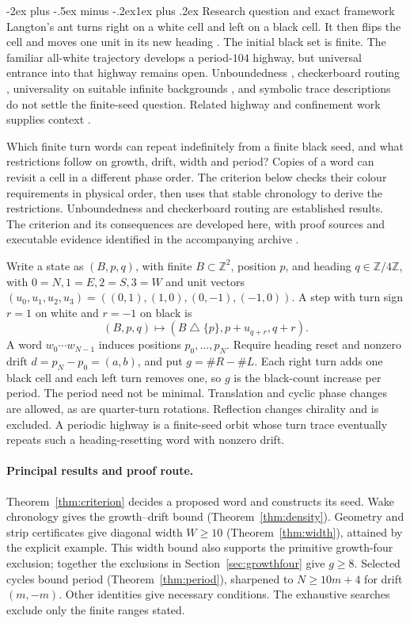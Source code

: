 \documentclass[11pt,letterpaper]{article}
\makeatletter
\renewcommand\section{\@startsection{section}{1}{\z@}%
  {-2ex plus -.5ex minus -.2ex}{1ex plus .2ex}%
  {\normalfont\Large\bfseries}}
\newcommand{\Z}{\mathbb Z}
\makeatother
\begin{document}
\section{Research question and exact framework}
Langton's ant turns right on a white cell and left on a black cell.
It then flips the cell and moves one unit in its new heading \cite{Langton1986}.
The initial black set is finite. The familiar all-white trajectory develops
a period-$104$ highway, but universal entrance into that highway remains
open. Unboundedness \cite{BunimovichTroubetzkoy1992}, checkerboard routing
\cite{GaleProppSutnerTroubetzkoy1995}, universality on suitable infinite
backgrounds \cite{GajardoMoreiraGoles2002}, and symbolic trace descriptions
\cite{Gajardo2003symbolic} do not settle the finite-seed question.
Related highway and confinement work supplies context
\cite{GajardoLutfallaRao2024,Lutfalla2025sideways,Etse2026confined}.

Which finite turn words can repeat indefinitely from a finite black seed,
and what restrictions follow on growth, drift, width and period? Copies
of a word can revisit a cell in a different phase order. The criterion
below checks their colour requirements in physical order, then uses
that stable chronology to derive the restrictions.
Unboundedness and checkerboard routing are established results. The
criterion and its consequences are developed here, with proof sources
and executable evidence identified in the accompanying archive \cite{Repo}.

Write a state as $(B,p,q)$, with finite $B\subset\Z^2$, position $p$, and
heading $q\in\Z/4\Z$, with $0=N,1=E,2=S,3=W$ and unit vectors
$(u_0,u_1,u_2,u_3)=((0,1),(1,0),(0,-1),(-1,0))$. A
step with turn sign $r=1$ on white and $r=-1$ on black is
\[
(B,p,q)\longmapsto(B\mathbin\triangle\{p\},p+u_{q+r},q+r).
\]
A word $w_0\cdots w_{N-1}$ induces positions $p_0,\ldots,p_N$.
Require heading reset and nonzero drift $d=p_N-p_0=(a,b)$, and put
$g=\#R-\#L$. Each right turn adds one black cell and each left turn
removes one, so $g$ is the black-count increase per period. The period
need not be minimal. Translation and cyclic phase changes are allowed,
as are quarter-turn rotations. Reflection changes chirality and is excluded.
A periodic highway is a finite-seed orbit whose turn trace eventually
repeats such a heading-resetting word with nonzero drift.

\paragraph{Principal results and proof route.}
Theorem~\ref{thm:criterion} decides a proposed word and constructs its seed.
Wake chronology gives the growth--drift bound (Theorem~\ref{thm:density}).
Geometry and strip certificates give diagonal width $W\ge10$
(Theorem~\ref{thm:width}), attained by the explicit example. This width
bound also supports the primitive growth-four exclusion; together the
exclusions in Section~\ref{sec:growthfour} give $g\ge8$. Selected cycles
bound period (Theorem~\ref{thm:period}), sharpened to $N\ge10m+4$
for drift $(m,-m)$. Other identities give necessary conditions. The exhaustive searches
exclude only the finite ranges stated.
\end{document}
